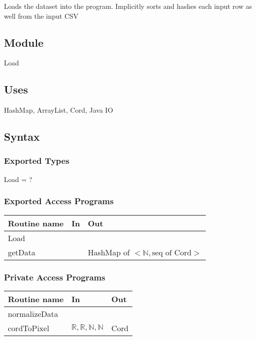 \documentclass[12pt]{article}
\begin{document}
Loads the dataset into the program. Implicitly sorts and hashes each input row as well 
from the input CSV

\subsection*{Module}

Load

\subsection* {Uses}

HashMap, ArrayList, Cord, Java IO

\subsection* {Syntax}

\subsubsection* {Exported Types}

Load = ?

\subsubsection* {Exported Access Programs}

\begin{tabular}{| l | l | l |}
\hline
\textbf{Routine name} & \textbf{In} & \textbf{Out}\\
\hline
Load & ~ & ~ \\
\hline
getData & ~ & HashMap of $<\mathbb{N}, \mbox{seq of Cord}>$\\
\hline
\end{tabular}

\subsubsection* {Private Access Programs}

\begin{tabular}{| l | l | l |}
\hline
\textbf{Routine name} & \textbf{In} & \textbf{Out}\\
\hline
normalizeData & ~ & ~ \\
\hline
cordToPixel & $\mathbb{R}, \mathbb{R}, \mathbb{N}, \mathbb{N}$ & Cord\\
\hline
\end{tabular}
\end{document}
